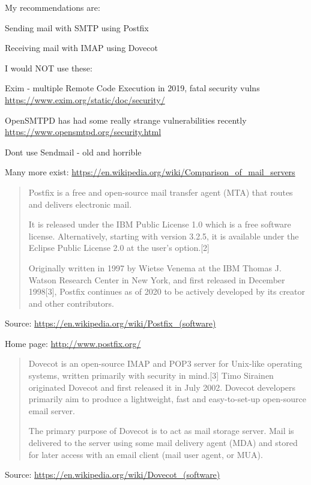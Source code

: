 \documentclass[Screen16to9,17pt]{foils}
\begin{document}

My recommendations are:
\begin{list2}
\item Sending mail with SMTP using Postfix
\item Receiving mail with IMAP using Dovecot
\end{list2}

I would NOT use these:
\begin{list2}
\item Exim - multiple Remote Code Execution in 2019, fatal security vulns \\
\url{https://www.exim.org/static/doc/security/}
\item OpenSMTPD has had some really strange vulnerabilities recently\\
\url{https://www.opensmtpd.org/security.html}
\item Dont use Sendmail - old and horrible
\end{list2}


Many more exist: \url{https://en.wikipedia.org/wiki/Comparison_of_mail_servers}



\begin{quote}
  Postfix is a free and open-source mail transfer agent (MTA) that routes and delivers electronic mail.

It is released under the IBM Public License 1.0 which is a free software license. Alternatively, starting with version 3.2.5, it is available under the Eclipse Public License 2.0 at the user's option.[2]

Originally written in 1997 by Wietse Venema at the IBM Thomas J. Watson Research Center in New York, and first released in December 1998[3], Postfix continues as of 2020 to be actively developed by its creator and other contributors.
\end{quote}
Source: \url{https://en.wikipedia.org/wiki/Postfix_(software)}

Home page: \url{http://www.postfix.org/}



\begin{quote}
Dovecot is an open-source IMAP and POP3 server for Unix-like operating systems, written primarily with security in mind.[3] Timo Sirainen originated Dovecot and first released it in July 2002. Dovecot developers primarily aim to produce a lightweight, fast and easy-to-set-up open-source email server.

The primary purpose of Dovecot is to act as mail storage server. Mail is delivered to the server using some mail delivery agent (MDA) and stored for later access with an email client (mail user agent, or MUA).
\end{quote}
Source: \url{https://en.wikipedia.org/wiki/Dovecot_(software)}
\end{document}
